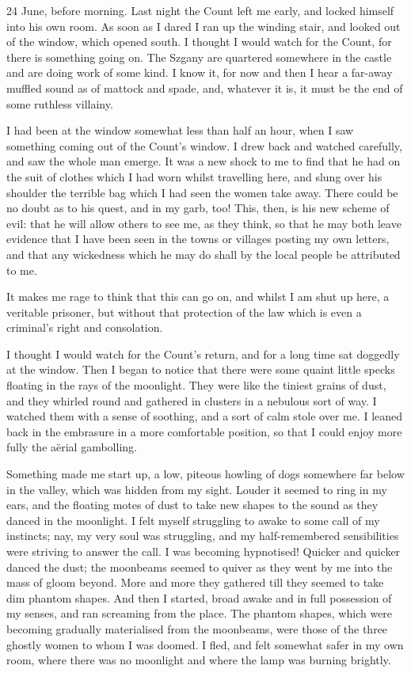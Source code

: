 \begin{diary}{24 June, before morning.}
Last night the Count left me early, and locked himself into his own room. As soon as I dared I ran up the winding stair, and looked out of the window, which opened south. I thought I would watch for the Count, for there is something going on. The Szgany are quartered somewhere in the castle and are doing work of some kind. I know it, for now and then I hear a far-away muffled sound as of mattock and spade, and, whatever it is, it must be the end of some ruthless villainy.

I had been at the window somewhat less than half an hour, when I saw something coming out of the Count's window. I drew back and watched carefully, and saw the whole man emerge. It was a new shock to me to find that he had on the suit of clothes which I had worn whilst travelling here, and slung over his shoulder the terrible bag which I had seen the women take away. There could be no doubt as to his quest, and in my garb, too! This, then, is his new scheme of evil: that he will allow others to see me, as they think, so that he may both leave evidence that I have been seen in the towns or villages posting my own letters, and that any wickedness which he may do shall by the local people be attributed to me.

It makes me rage to think that this can go on, and whilst I am shut up here, a veritable prisoner, but without that protection of the law which is even a criminal's right and consolation.

I thought I would watch for the Count's return, and for a long time sat doggedly at the window. Then I began to notice that there were some quaint little specks floating in the rays of the moonlight. They were like the tiniest grains of dust, and they whirled round and gathered in clusters in a nebulous sort of way. I watched them with a sense of soothing, and a sort of calm stole over me. I leaned back in the embrasure in a more comfortable position, so that I could enjoy more fully the aërial gambolling.

Something made me start up, a low, piteous howling of dogs somewhere far below in the valley, which was hidden from my sight. Louder it seemed to ring in my ears, and the floating motes of dust to take new shapes to the sound as they danced in the moonlight. I felt myself struggling to awake to some call of my instincts; nay, my very soul was struggling, and my half-remembered sensibilities were striving to answer the call. I was becoming hypnotised! Quicker and quicker danced the dust; the moonbeams seemed to quiver as they went by me into the mass of gloom beyond. More and more they gathered till they seemed to take dim phantom shapes. And then I started, broad awake and in full possession of my senses, and ran screaming from the place. The phantom shapes, which were becoming gradually materialised from the moonbeams, were those of the three ghostly women to whom I was doomed. I fled, and felt somewhat safer in my own room, where there was no moonlight and where the lamp was burning brightly.


\end{diary}
